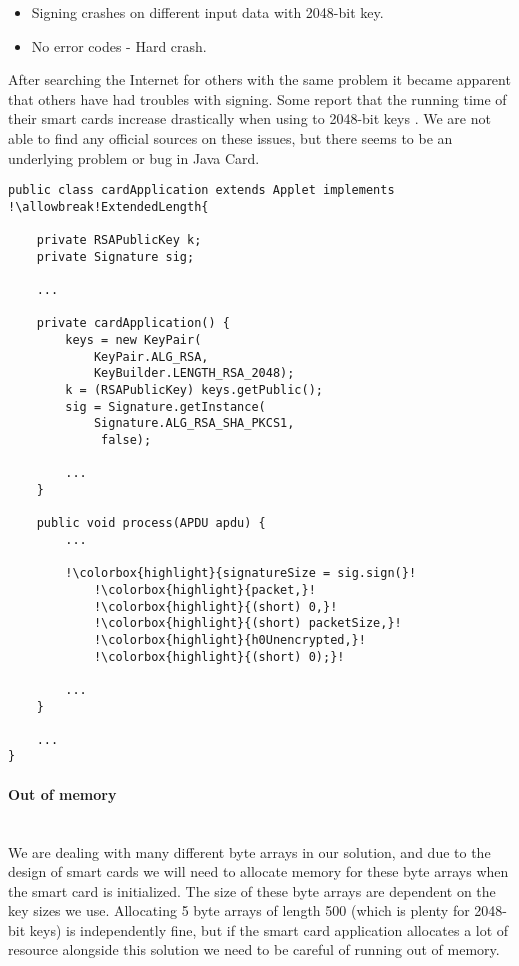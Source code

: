 \begin{itemize}
    \item Signing crashes on different input data with 2048-bit key.
    \item No error codes - Hard crash.
\end{itemize}

After searching the Internet for others with the same problem it became apparent that others have had troubles with signing. Some report that the running time of their smart cards increase drastically when using to 2048-bit keys \cite{signingtrouble2}. We are not able to find any official sources on these issues, but there seems to be an underlying problem or bug in Java Card.

\begin{lstlisting}[caption=Java Card failed signing., label=lst:signing2048, escapechar=!]
public class cardApplication extends Applet implements !\allowbreak!ExtendedLength{

    private RSAPublicKey k;
    private Signature sig;

    ...

    private cardApplication() {
        keys = new KeyPair(
            KeyPair.ALG_RSA,
            KeyBuilder.LENGTH_RSA_2048);
        k = (RSAPublicKey) keys.getPublic();
    	sig = Signature.getInstance(
            Signature.ALG_RSA_SHA_PKCS1,
             false);

        ...
    }

    public void process(APDU apdu) {
    	...

        !\colorbox{highlight}{signatureSize = sig.sign(}!
            !\colorbox{highlight}{packet,}!
            !\colorbox{highlight}{(short) 0,}!
            !\colorbox{highlight}{(short) packetSize,}!
            !\colorbox{highlight}{h0Unencrypted,}!
            !\colorbox{highlight}{(short) 0);}!

        ...
    }

    ...
}
\end{lstlisting}

\paragraph{Out of memory}\mbox{}\\
We are dealing with many different byte arrays in our solution, and due to the design of smart cards we will need to allocate memory for these byte arrays when the smart card is initialized. The size of these byte arrays are dependent on the key sizes we use. Allocating 5 byte arrays of length 500 (which is plenty for 2048-bit keys) is independently fine, but if the smart card application allocates a lot of resource alongside this solution we need to be careful of running out of memory.

